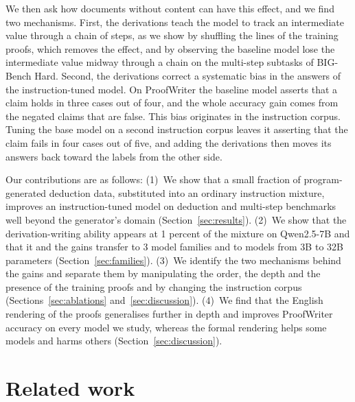 \documentclass{article}
\begin{document}
We then ask how documents without content can have this effect, and we find
two mechanisms. First, the derivations teach the model to track an
intermediate value through a chain of steps, as we show by shuffling the
lines of the training proofs, which removes the effect, and by observing the
baseline model lose the intermediate value midway through a chain on the
multi-step subtasks of BIG-Bench Hard. Second,
the derivations correct a systematic bias in the answers of the
instruction-tuned model. On ProofWriter the baseline model asserts that a
claim holds in three cases out of four, and the whole accuracy gain comes
from the negated claims that are false. This bias originates in the instruction corpus. Tuning the base model on a
second instruction corpus leaves it asserting that the claim fails in four
cases out of five, and adding the derivations then moves its answers back
toward the labels from the other side.

Our contributions are as follows: (1)~We show that a small fraction of
program-generated deduction data, substituted into an ordinary instruction
mixture, improves an instruction-tuned model on deduction and multi-step
benchmarks well beyond the generator's domain (Section~\ref{sec:results}).
(2)~We show that the derivation-writing ability appears at 1 percent of
the mixture on Qwen2.5-7B and that it and the gains transfer to
3 model families and to models from 3B to 32B parameters
(Section~\ref{sec:families}). (3)~We identify the two mechanisms behind
the gains and separate them by manipulating the order, the depth and the
presence of the training proofs and by changing the instruction corpus
(Sections~\ref{sec:ablations} and~\ref{sec:discussion}). (4)~We find that the
English rendering of the proofs generalises further in depth and improves
ProofWriter accuracy on every model we study, whereas the formal rendering
helps some models and harms others (Section~\ref{sec:discussion}).

\section{Related work}
\end{document}
